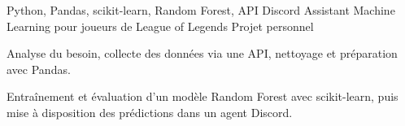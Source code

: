 
\begin{cventries}
  \cventry
    {Python, Pandas, scikit-learn, Random Forest, API Discord}
    {Assistant Machine Learning pour joueurs de League of Legends}
    {Projet personnel}
    {}
    {
      \begin{cvitems}
        \item {Analyse du besoin, collecte des données via une API, nettoyage et préparation avec Pandas.}
        \item {Entraînement et évaluation d’un modèle Random Forest avec scikit-learn, puis mise à disposition des prédictions dans un agent Discord.}
      \end{cvitems}
    }
\end{cventries}
